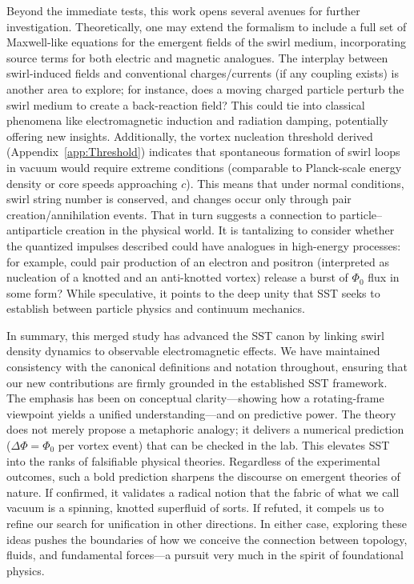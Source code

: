 \documentclass[12pt]{article}
\begin{document}
Beyond the immediate tests, this work opens several avenues for further investigation. Theoretically, one may extend the formalism to include a full set of Maxwell-like equations for the emergent fields of the swirl medium, incorporating source terms for both electric and magnetic analogues. The interplay between swirl-induced fields and conventional charges/currents (if any coupling exists) is another area to explore; for instance, does a moving charged particle perturb the swirl medium to create a back-reaction field? This could tie into classical phenomena like electromagnetic induction and radiation damping, potentially offering new insights. Additionally, the vortex nucleation threshold derived (Appendix~\ref{app:Threshold}) indicates that spontaneous formation of swirl loops in vacuum would require extreme conditions (comparable to Planck-scale energy density or core speeds approaching $c$). This means that under normal conditions, swirl string number is conserved, and changes occur only through pair creation/annihilation events. That in turn suggests a connection to particle--antiparticle creation in the physical world. It is tantalizing to consider whether the quantized impulses described could have analogues in high-energy processes: for example, could pair production of an electron and positron (interpreted as nucleation of a knotted and an anti-knotted vortex) release a burst of $\Phi_{0}$ flux in some form? While speculative, it points to the deep unity that SST seeks to establish between particle physics and continuum mechanics.


In summary, this merged study has advanced the SST canon by linking swirl density dynamics to observable electromagnetic effects. We have maintained consistency with the canonical definitions and notation \cite{Iskandarani2025Canon,Iskandarani2025Rosetta} throughout, ensuring that our new contributions are firmly grounded in the established SST framework. The emphasis has been on conceptual clarity—showing how a rotating-frame viewpoint yields a unified understanding—and on predictive power. The theory does not merely propose a metaphoric analogy; it delivers a numerical prediction ($\Delta \Phi = \Phi_{0}$ per vortex event) that can be checked in the lab. This elevates SST into the ranks of falsifiable physical theories. Regardless of the experimental outcomes, such a bold prediction sharpens the discourse on emergent theories of nature. If confirmed, it validates a radical notion that the fabric of what we call vacuum is a spinning, knotted superfluid of sorts. If refuted, it compels us to refine our search for unification in other directions. In either case, exploring these ideas pushes the boundaries of how we conceive the connection between topology, fluids, and fundamental forces—a pursuit very much in the spirit of foundational physics.
\end{document}
